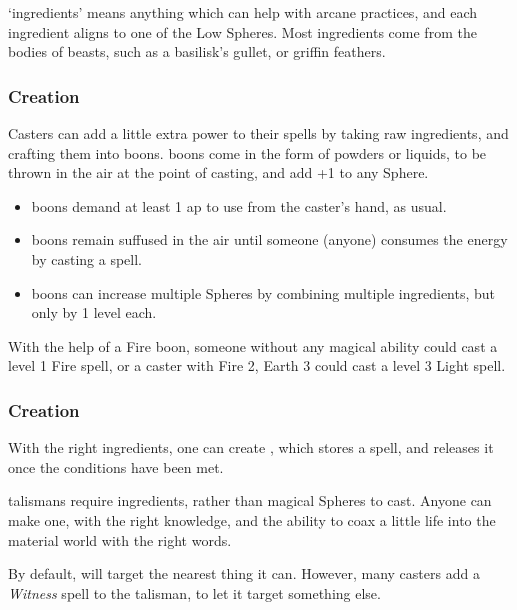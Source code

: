 \begin{multicols}{2}

\noindent
`\Glspl{ingredient}' means anything which can help with arcane practices, and each \gls{ingredient} aligns to one of the Low Spheres.
Most \glspl{ingredient} come from the bodies of beasts, such as a basilisk's gullet, or griffin feathers.

\subsubsection{ Creation}

Casters can add a little extra power to their spells by taking raw \glspl{ingredient}, and crafting them into \glspl{boon}.
\Glspl{boon} come in the form of powders or liquids, to be thrown in the air at the point of casting, and add +1 to any Sphere.

\begin{itemize}
  \item
  \Glspl{boon} demand at least 1 \gls{ap} to use from the caster's hand, as usual.
  \item
  \Glspl{boon} remain suffused in the air until someone (anyone) consumes the energy by casting a spell.
  \item
  \Glspl{boon} can increase multiple Spheres by combining multiple \glspl{ingredient}, but only by 1 level each.
\end{itemize}

\noindent
With the help of a Fire \gls{boon}, someone without any magical ability could cast a level 1 Fire spell, or a caster with Fire 2, Earth 3 could cast a level 3 Light spell.

\subsubsection{ Creation}

With the right \glspl{ingredient}, one can create , which stores a spell, and releases it once the conditions have been met.

\Glspl{talisman} require \glspl{ingredient}, rather than magical Spheres to cast.
Anyone can make one, with the right knowledge, and the ability to coax a little life into the material world with the right words.

By default,  will target the nearest thing it can.
However, many casters add a \textit{Witness} spell to the \gls{talisman}, to let it target something else.


\end{multicols}
